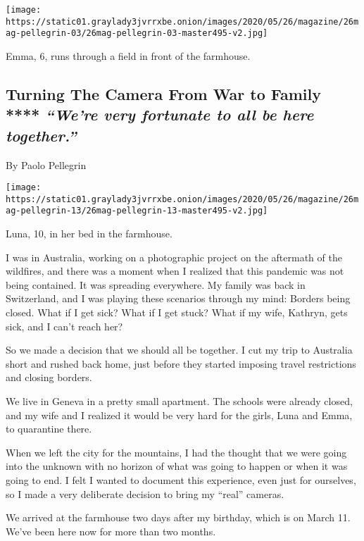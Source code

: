 \texttt{[image: https://static01.graylady3jvrrxbe.onion/images/2020/05/26/magazine/26mag-pellegrin-03/26mag-pellegrin-03-master495-v2.jpg]}

Emma, 6, runs through a field in front of the farmhouse.

\hypertarget{turning-the-camera-from-war-to-family--were-very-fortunate-to-all-be-here-together}{%
\subsection{\texorpdfstring{Turning The Camera From War to Family ****
\emph{``We're very fortunate to all be here
together.''}}{Turning The Camera From War to Family **** ``We're very fortunate to all be here together.''}}\label{turning-the-camera-from-war-to-family--were-very-fortunate-to-all-be-here-together}}

By Paolo Pellegrin

\texttt{[image: https://static01.graylady3jvrrxbe.onion/images/2020/05/26/magazine/26mag-pellegrin-13/26mag-pellegrin-13-master495-v2.jpg]}

Luna, 10, in her bed in the farmhouse.

I was in Australia, working on a photographic project on the aftermath
of the wildfires, and there was a moment when I realized that this
pandemic was not being contained. It was spreading everywhere. My family
was back in Switzerland, and I was playing these scenarios through my
mind: Borders being closed. What if I get sick? What if I get stuck?
What if my wife, Kathryn, gets sick, and I can't reach her?

So we made a decision that we should all be together. I cut my trip to
Australia short and rushed back home, just before they started imposing
travel restrictions and closing borders.

We live in Geneva in a pretty small apartment. The schools were already
closed, and my wife and I realized it would be very hard for the girls,
Luna and Emma, to quarantine there.

When we left the city for the mountains, I had the thought that we were
going into the unknown with no horizon of what was going to happen or
when it was going to end. I felt I wanted to document this experience,
even just for ourselves, so I made a very deliberate decision to bring
my ``real'' cameras.

We arrived at the farmhouse two days after my birthday, which is on
March 11. We've been here now for more than two months.

